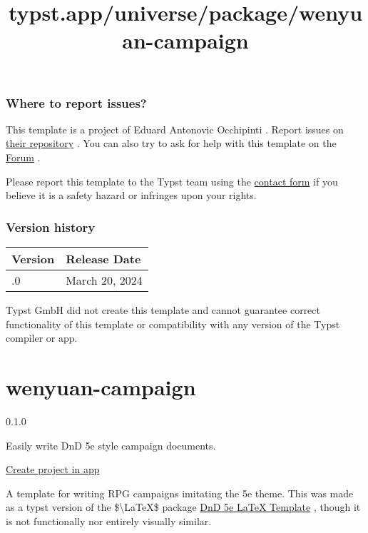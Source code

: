 \subsubsection{Where to report issues?}\label{where-to-report-issues}

This template is a project of Eduard Antonovic Occhipinti . Report
issues on \href{https://github.com/eduardz1/unito-typst-template}{their
repository} . You can also try to ask for help with this template on the
\href{https://forum.typst.app}{Forum} .

Please report this template to the Typst team using the
\href{https://typst.app/contact}{contact form} if you believe it is a
safety hazard or infringes upon your rights.

\label{versions}
\subsubsection{Version history}\label{version-history}

\begin{longtable}[]{@{}ll@{}}
\toprule\noalign{}
Version & Release Date \\
\midrule\noalign{}
\endhead
\bottomrule\noalign{}
\endlastfoot
0.1.0 & March 20, 2024 \\
\end{longtable}

Typst GmbH did not create this template and cannot guarantee correct
functionality of this template or compatibility with any version of the
Typst compiler or app.


\title{typst.app/universe/package/wenyuan-campaign}

\label{banner}
\label{template-thumbnail}

\section{wenyuan-campaign}\label{wenyuan-campaign}

{ 0.1.0 }

Easily write DnD 5e style campaign documents.

\href{/app?template=wenyuan-campaign&version=0.1.0}{Create project in
app}

\label{readme}
A template for writing RPG campaigns imitating the 5e theme. This was
made as a typst version of the \$\textbackslash LaTeX\$ package
\href{https://github.com/rpgtex/DND-5e-LaTeX-Template}{DnD 5e LaTeX
Template} , though it is not functionally nor entirely visually similar.

